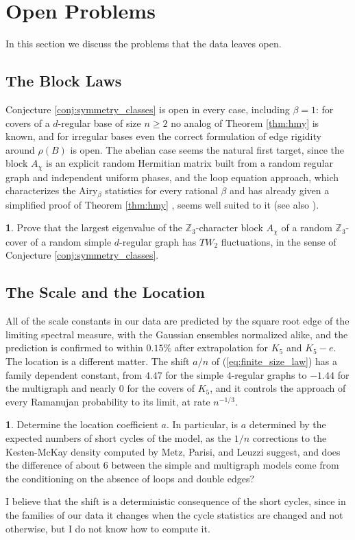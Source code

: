 \documentclass[12pt,oneside,english]{amsart}
\numberwithin{equation}{section}
\numberwithin{figure}{section}
\numberwithin{table}{section}
\theoremstyle{plain}
\numberwithin{thm}{section}
\theoremstyle{plain}
\theoremstyle{plain}
\theoremstyle{plain}
\theoremstyle{definition}
\theoremstyle{definition}
\theoremstyle{definition}
\newtheorem{problem}[thm]{\protect\problemname}
\theoremstyle{remark}
\providecommand{\problemname}{Problem}
\begin{document}
\section{\label{sec:open_problems}Open Problems}

In this section we discuss the problems that the data leaves open.

\subsection*{The Block Laws}

Conjecture \ref{conj:symmetry_classes} is open in every case, including
$\beta=1$: for covers of a $d$-regular base of size $n\geq2$ no
analog of Theorem \ref{thm:hmy} is known, and for irregular bases
even the correct formulation of edge rigidity around $\rho(B)$ is
open. The abelian case seems the natural first target, since the block
$A_{\chi}$ is an explicit random Hermitian matrix built from a random
regular graph and independent uniform phases, and the loop equation
approach, which characterizes the Airy$_{\beta}$ statistics for every
rational $\beta$ and has already given a simplified proof of Theorem
\ref{thm:hmy} \cite{BourgadeHuang2026}, seems well suited to it
(see also \cite{HuangYau2026}).
\begin{problem}
\label{prob:abelian_block}Prove that the largest eigenvalue of the
$\mathbb{Z}_{3}$-character block $A_{\chi}$ of a random $\mathbb{Z}_{3}$-cover
of a random simple $d$-regular graph has $TW_{2}$ fluctuations,
in the sense of Conjecture \ref{conj:symmetry_classes}.
\end{problem}

\subsection*{The Scale and the Location}

All of the scale constants in our data are predicted by the square
root edge of the limiting spectral measure, with the Gaussian ensembles
normalized alike, and the prediction is confirmed to within $0.15\%$
after extrapolation for $K_{5}$ and $K_{5}-e$. The location is a
different matter. The shift $a/n$ of (\ref{eq:finite_size_law})
has a family dependent constant, from $4.47$ for the simple $4$-regular
graphs to $-1.44$ for the multigraph and nearly $0$ for the covers
of $K_{5}$, and it controls the approach of every Ramanujan probability
to its limit, at rate $n^{-1/3}$.
\begin{problem}
\label{prob:location}Determine the location coefficient $a$. In
particular, is $a$ determined by the expected numbers of short cycles
of the model, as the $1/n$ corrections to the Kesten-McKay density
computed by Metz, Parisi, and Leuzzi \cite{MetzParisiLeuzzi2014}
suggest, and does the difference of about $6$ between the simple
and multigraph models come from the conditioning on the absence of
loops and double edges?
\end{problem}
I believe that the shift is a deterministic consequence of the short
cycles, since in the families of our data it changes when the cycle
statistics are changed and not otherwise, but I do not know how to
compute it.
\end{document}

